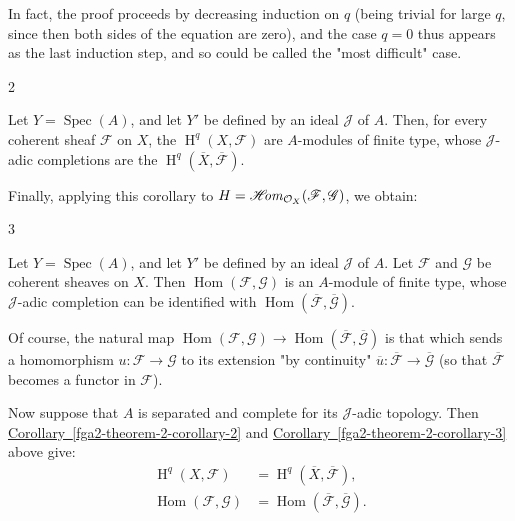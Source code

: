   In fact, the proof proceeds by decreasing induction on \(q\) (being trivial for large \(q\), since then both sides of the equation are zero), and the case \(q=0\) thus appears as the last induction step, and so could be called the "most difficult" case.\begin{corollary}{2}\label{fga2-theorem-2-corollary-2}\skipsinglepar\par{}Let \(Y=\operatorname {Spec}(A)\), and let \(Y'\) be defined by an ideal \(\mathscr {J}\) of \(A\).
    Then, for every coherent sheaf \(\mathscr {F}\) on \(X\), the \(\operatorname {H}^q(X,\mathscr {F})\) are \(A\)-modules of finite type, whose \(\mathscr {J}\)-adic completions are the \(\operatorname {H}^q(\overline {X},\overline {\mathscr {F}})\).\end{corollary}\par{}Finally, applying this corollary to \(H=\mathscr {H}\kern  -2.5pt\mathit {om}_{\mathcal {O}_X}(\mathscr {F},\mathscr {G})\), we obtain:\begin{corollary}{3}\label{fga2-theorem-2-corollary-3}\skipsinglepar\par{}Let \(Y=\operatorname {Spec}(A)\), and let \(Y'\) be defined by an ideal \(\mathscr {J}\) of \(A\).
    Let \(\mathscr {F}\) and \(\mathscr {G}\) be coherent sheaves on \(X\).
    Then \(\operatorname {Hom}(\mathscr {F},\mathscr {G})\) is an \(A\)-module of finite type, whose \(\mathscr {J}\)-adic completion can be identified with \(\operatorname {Hom}(\overline {\mathscr {F}},\overline {\mathscr {G}})\).\end{corollary}\par{}Of course, the natural map \(\operatorname {Hom}(\mathscr {F},\mathscr {G})\to \operatorname {Hom}(\overline {\mathscr {F}},\overline {\mathscr {G}})\) is that which sends a homomorphism \(u\colon \mathscr {F}\to \mathscr {G}\) to its extension "by continuity" \(\overline {u}\colon \overline {\mathscr {F}}\to \overline {\mathscr {G}}\) (so that \(\overline {\mathscr {F}}\) becomes a functor in \(\mathscr {F}\)).\par{}Now suppose that \(A\) is separated and complete for its \(\mathscr {J}\)-adic topology.
  Then \hyperref[fga2-theorem-2-corollary-2]{Corollary~\ref*{fga2-theorem-2-corollary-2}} and \hyperref[fga2-theorem-2-corollary-3]{Corollary~\ref*{fga2-theorem-2-corollary-3}} above give:
  \[     \begin {aligned}       \operatorname {H}^q(X,\mathscr {F}) &= \operatorname {H}^q(\overline {X},\overline {\mathscr {F}}),     \\\operatorname {Hom}(\mathscr {F},\mathscr {G}) &= \operatorname {Hom}(\overline {\mathscr {F}},\overline {\mathscr {G}}).     \end {aligned}   \]
  
